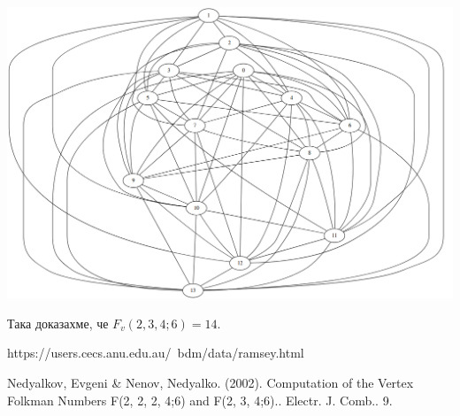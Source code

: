 \documentclass[letterpaper,12pt]{article}
\theoremstyle{definition}
\begin{document}
\begin{enumerate}[Стъпка 1:]
\includegraphics[scale=0.25]{second14vertex.png}

Така доказахме, че $F_v(2,3,4;6)=14$.

\end{enumerate}
 
\begin{thebibliography}{99}

 https://users.cecs.anu.edu.au/~bdm/data/ramsey.html

Nedyalkov, Evgeni & Nenov, Nedyalko. (2002). Computation of the Vertex Folkman Numbers F(2, 2, 2, 4;6) and F(2, 3, 4;6).. Electr. J. Comb.. 9. 

\end{thebibliography}
\end{document}
